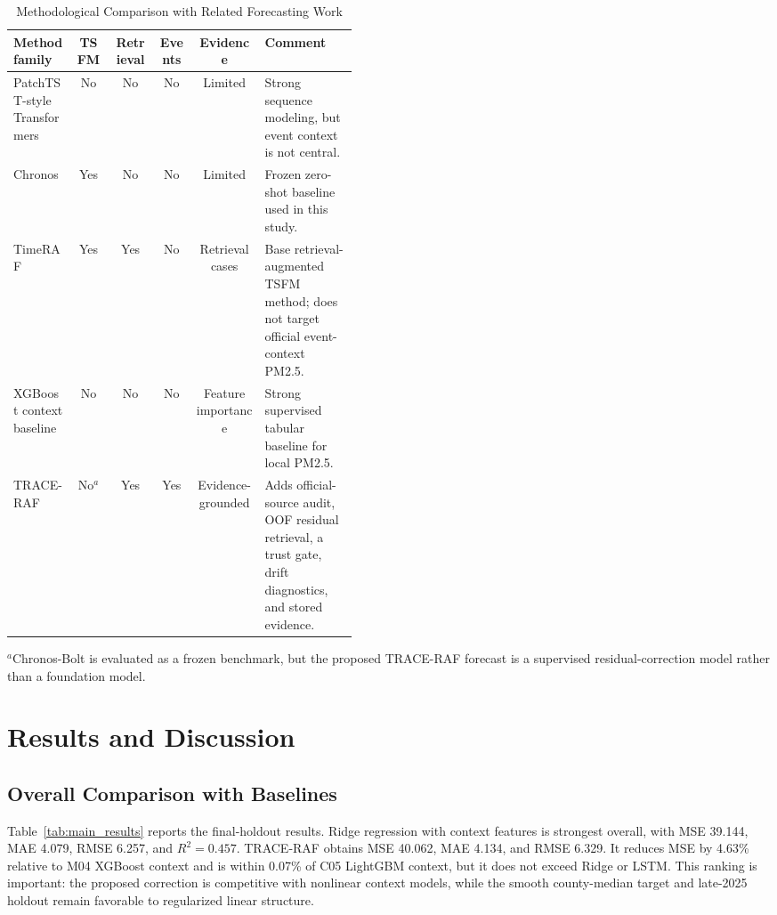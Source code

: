 \documentclass{ieeeaccess}
\begin{document}
\begin{table}[!t]
\centering
\caption{Methodological Comparison with Related Forecasting Work}
\label{tab:literature_positioning}
\begin{tabular}{p{0.18\linewidth}ccccp{0.27\linewidth}}
\toprule
Method family & TSFM & Retrieval & Events & Evidence & Comment \\
\midrule
PatchTST-style Transformers \cite{nie2023patchtst} & No & No & No & Limited &
Strong sequence modeling, but event context is not central. \\
Chronos \cite{ansari2024chronos} & Yes & No & No & Limited & Frozen
zero-shot baseline used in this study. \\
TimeRAF \cite{zhang2025timeraf} & Yes & Yes & No & Retrieval cases & Base
retrieval-augmented TSFM method; does not target official event-context PM2.5. \\
XGBoost context baseline \cite{chen2016xgboost} & No & No & No & Feature
importance & Strong supervised tabular baseline for local PM2.5. \\
TRACE-RAF & No$^{a}$ & Yes & Yes & Evidence-grounded & Adds official-source
audit, OOF residual retrieval, a trust gate, drift diagnostics, and stored
evidence. \\
\bottomrule
\end{tabular}
\vspace{2pt}\parbox{0.96\textwidth}{\footnotesize $^{a}$Chronos-Bolt is
evaluated as a frozen benchmark, but the proposed TRACE-RAF forecast is a
supervised residual-correction model rather than a foundation model.}
\end{table}
\section{Results and Discussion}

\subsection{Overall Comparison with Baselines}
Table~\ref{tab:main_results} reports the final-holdout results. Ridge regression
with context features is strongest overall, with MSE 39.144, MAE 4.079, RMSE
6.257, and $R^2=0.457$. TRACE-RAF obtains MSE 40.062, MAE 4.134, and RMSE
6.329. It reduces MSE by 4.63\% relative to M04 XGBoost context and is within
0.07\% of C05 LightGBM context, but it does not exceed Ridge or LSTM. This
ranking is important: the proposed correction is competitive with nonlinear
context models, while the smooth county-median target and late-2025 holdout
remain favorable to regularized linear structure.
\end{document}
